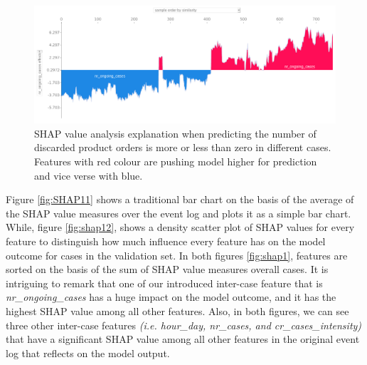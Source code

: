 \begin{figure}[!htbp]
	\includegraphics[width=\linewidth]{images/shap/allsamples_ongoing.png}
	\caption[SHAP force plot product (true outcome)]{SHAP value analysis explanation when predicting the number of discarded product orders is more or less than zero in different cases. Features with red colour are pushing model higher for prediction and vice verse with blue.}
	\label{fig:afp}
\end{figure}\hspace*{\fill}



Figure \ref{fig:SHAP11} shows a traditional bar chart on the basis of the average of the SHAP value measures over the event log and plots it as a simple bar chart. While, figure \ref{fig:shap12}, shows a density scatter plot of SHAP values for every feature to distinguish how much influence every feature has on the model outcome for cases in the validation set. In both figures \ref{fig:shap1}, features are sorted on the basis of the sum of SHAP value measures overall cases. It is intriguing to remark that one of our introduced inter-case feature that is  \textit{nr\_ongoing\_cases} has a huge impact on the model outcome, and it has the highest SHAP value among all other features. Also, in both figures, we can see three other inter-case features \textit{(i.e. hour\_day, nr\_cases, and cr\_cases\_intensity)} that have a significant SHAP value among all other features in the original event log that reflects on the model output. 


